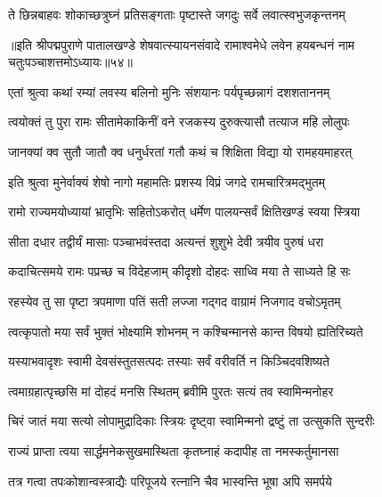 \twolineshloka
{ते छिन्नबाहवः शोकाच्छत्रुघ्नं प्रतिसङ्गताः}
{पृष्टास्ते जगदुः सर्वे लवात्स्वभुजकृन्तनम्}%

{॥इति श्रीपद्मपुराणे पातालखण्डे शेषवात्स्यायनसंवादे रामाश्वमेधे लवेन हयबन्धनं नाम चतुःपञ्चाशत्तमोऽध्यायः॥५४॥}



\twolineshloka
{एतां श्रुत्वा कथां रम्यां लवस्य बलिनो मुनिः}
{संशयानः पर्यपृच्छन्नागं दशशताननम्}%


\twolineshloka
{त्वयोक्तं तु पुरा रामः सीतामेकाकिनीं वने}
{रजकस्य दुरुक्त्यासौ तत्याज महि लोलुपः}%

\twolineshloka
{जानक्यां क्व सुतौ जातौ क्व धनुर्धरतां गतौ}
{कथं च शिक्षिता विद्या यो रामहयमाहरत्}%


\twolineshloka
{इति श्रुत्वा मुनेर्वाक्यं शेषो नागो महामतिः}
{प्रशस्य विप्रं जगदे रामचारित्रमद्भुतम्}%


\twolineshloka
{रामो राज्यमयोध्यायां भ्रातृभिः सहितोऽकरोत्}
{धर्मेण पालयन्सर्वं क्षितिखण्डं स्वया स्त्रिया}%

\twolineshloka
{सीता दधार तद्वीर्यं मासाः पञ्चाभवंस्तदा}
{अत्यन्तं शुशुभे देवी त्रयीव पुरुषं धरा}%

\twolineshloka
{कदाचित्समये रामः पप्रच्छ च विदेहजाम्}
{कीदृशो दोहदः साध्वि मया ते साध्यते हि सः}%

\twolineshloka
{रहस्येव तु सा पृष्टा त्रपमाणा पतिं सती}
{लज्जा गद्गद वाग्रामं निजगाद वचोऽमृतम्}%


\twolineshloka
{त्वत्कृपातो मया सर्वं भुक्तं भोक्ष्यामि शोभनम्}
{न कश्चिन्मानसे कान्त विषयो ह्यतिरिच्यते}%

\twolineshloka
{यस्याभवादृशः स्वामी देवसंस्तुतसत्पदः}
{तस्याः सर्वं वरीवर्ति न किञ्चिदवशिष्यते}%

\twolineshloka
{त्वमाग्रहात्पृच्छसि मां दोहदं मनसि स्थितम्}
{ब्रवीमि पुरतः सत्यं तव स्वामिन्मनोहर}%

\twolineshloka
{चिरं जातं मया सत्यो लोपामुद्रादिकाः स्त्रियः}
{दृष्ट्वा स्वामिन्मनो द्रष्टुं ता उत्सुकति सुन्दरीः}%

\twolineshloka
{राज्यं प्राप्ता त्वया सार्द्धमनेकसुखमास्थिता}
{कृतघ्नाहं कदापीह ता नमस्कर्तुमानसा}%

\twolineshloka
{तत्र गत्वा तपःकोशान्वस्त्राद्यैः परिपूजये}
{रत्नानि चैव भास्वन्ति भूषा अपि समर्पये}%

